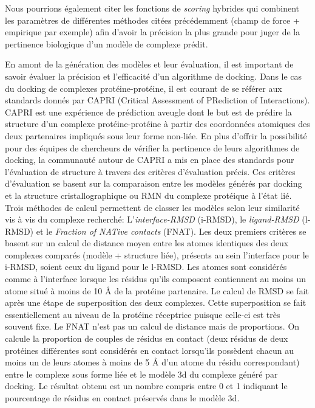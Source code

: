 Nous pourrions également citer les fonctions de \textit{scoring} hybrides qui combinent les paramètres de différentes méthodes citées précédemment (champ de force + empirique par exemple) afin d'avoir la précision la plus grande pour juger de la pertinence biologique d'un modèle de complexe prédit.

En amont de la génération des modèles et leur évaluation, il est important de savoir évaluer la précision et l'efficacité d'un algorithme de docking. Dans le cas du docking de complexes protéine-protéine, il est courant de se référer aux standards donnés par CAPRI (Critical Assessment of PRediction of Interactions). CAPRI est une expérience de prédiction aveugle dont le but est de prédire la structure d'un complexe protéine-protéine à partir des coordonnées atomiques des deux partenaires impliqués sous leur forme non-liée. En plus d'offrir la possibilité pour des équipes de chercheurs de vérifier la pertinence de leurs algorithmes de docking, la communauté autour de CAPRI a mis en place des standards pour l'évaluation de structure à travers des critères d'évaluation précis. Ces critères d'évaluation se basent sur la comparaison entre les modèles générés par docking et la structure cristallographique ou RMN du complexe protéique à l'état lié. Trois méthodes de calcul permettent de classer les modèles selon leur similarité vis à vis du complexe recherché: L'\textit{interface-RMSD} (i-RMSD), le \textit{ligand-RMSD} (l-RMSD) et le \textit{Fraction of NATive contacts} (FNAT). Les deux premiers critères se basent sur un calcul de distance moyen entre les atomes identiques des deux complexes comparés (modèle + structure liée), présents au sein l'interface pour le i-RMSD, soient ceux du ligand pour le l-RMSD. Les atomes sont considérés comme à l'interface lorsque les résidus qu'ils composent contiennent au moins un atome situé à moins de 10 \r{A} de la protéine partenaire. Le calcul de RMSD se fait après une étape de superposition des deux complexes. Cette superposition se fait essentiellement au niveau de la protéine réceptrice puisque celle-ci est très souvent fixe. Le FNAT n'est pas un calcul de distance mais de proportions. On calcule la proportion de couples de résidus en contact (deux résidus de deux protéines différentes sont considérés en contact lorsqu'ils possèdent chacun au moins un de leurs atomes à moins de 5 \r{A} d'un atome du résidu correspondant) entre le complexe sous forme liée et le modèle 3d du complexe généré par docking. Le résultat obtenu est un nombre compris entre 0 et 1 indiquant le pourcentage de résidus en contact préservés dans le modèle 3d.


